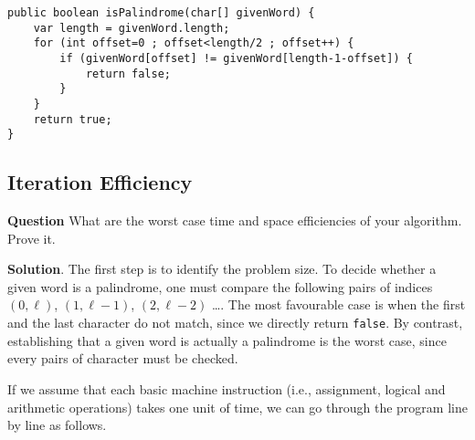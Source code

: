 \documentclass[11pt]{article}
\begin{document}
\begin{verbatim}
public boolean isPalindrome(char[] givenWord) {
    var length = givenWord.length;
    for (int offset=0 ; offset<length/2 ; offset++) {
        if (givenWord[offset] != givenWord[length-1-offset]) {
            return false;
        }
    }
    return true;
}
\end{verbatim}

\subsection{Iteration Efficiency}
\label{sec:org3fb20fb}

\textbf{Question} What are the worst case time and space efficiencies of
your algorithm. Prove it.

\textbf{Solution}. The first step is to identify the problem size. To
decide whether a given word is a palindrome, one must compare the
following pairs of indices \((0, \ell)\), \((1, \ell-1)\), \((2,
   \ell-2)\) \ldots. The most favourable case is when the first and the
last character do not match, since we directly return \texttt{false}. By
contrast, establishing that a given word is actually a palindrome
is the worst case, since every pairs of character must be checked.

If we assume that each basic machine instruction (i.e., assignment,
logical and arithmetic operations) takes one unit of time, we can
go through the program line by line as follows.
\end{document}
